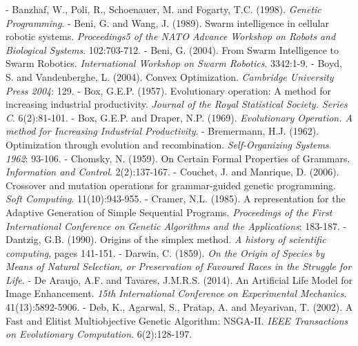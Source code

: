 \documentclass[spanish,a4paper,12pt,twoside]{report}
\begin{document}
  \begin{thebibliography}{00}
  \vspace{-1cm}
  \makeatletter
  \def\@biblabel#1{}
  \let\old@bibitem\bibitem
  \def\bibitem#1{\old@bibitem{#1}\leavevmode\kern-\bibindent}
  \makeatother
  
   Banzhaf, W., Poli, R., Schoenauer, M. and Fogarty, T.C. (1998). \emph{Genetic Programming}.
   Beni, G. and Wang, J. (1989). Swarm intelligence in cellular robotic systems. \emph{Proceedings5 of the NATO Advance Workshop on Robots and Biological Systems}. 102:703-712.
   Beni, G. (2004). From Swarm Intelligence to Swarm Robotics. \emph{International Workshop on Swarm Robotics}. 3342:1-9.
   Boyd, S. and Vandenberghe, L. (2004). Convex Optimization. \emph{Cambridge University Press 2004}: 129.
   Box, G.E.P. (1957). Evolutionary operation: A method for increasing industrial productivity. \emph{Journal of the Royal Statistical Society. Series C}. 6(2):81-101.
   Box, G.E.P. and Draper, N.P. (1969). \emph{Evolutionary Operation. A method for Increasing Industrial Productivity}.
   Bremermann, H.J. (1962). Optimization through evolution and recombination. \emph{Self-Organizing Systems 1962}: 93-106.
   Chomsky, N. (1959). On Certain Formal Properties of Grammars. \emph{Information and Control}. 2(2):137-167.
   Couchet, J. and Manrique, D. (2006). Crossover and mutation operations for grammar-guided genetic programming. \emph{Soft Computing}. 11(10):943-955.
   Cramer, N.L. (1985). A representation for the Adaptive Generation of Simple Sequential Programs. \emph{Proceedings of the First International Conference on Genetic Algorithms and the Applications}: 183-187.
   Dantzig, G.B. (1990). Origins of the simplex method. \emph{A history of scientific computing}, pages 141-151.
   Darwin, C. (1859). \emph{On the Origin of Species by Means of Natural Selection, or Preservation of Favoured Races in the Struggle for Life}. 
   De Araujo, A.F. and Tavares, J.M.R.S. (2014). An Artificial Life Model for Image Enhancement. \emph{15th International Conference on Experimental Mechanics}. 41(13):5892-5906.
   Deb, K., Agarwal, S., Pratap, A. and Meyarivan, T. (2002). A Fast and Elitist Multiobjective Genetic Algorithm: NSGA-II. \emph{IEEE Transactions on Evolutionary Computation}. 6(2):128-197.

\end{thebibliography}
\end{document}
